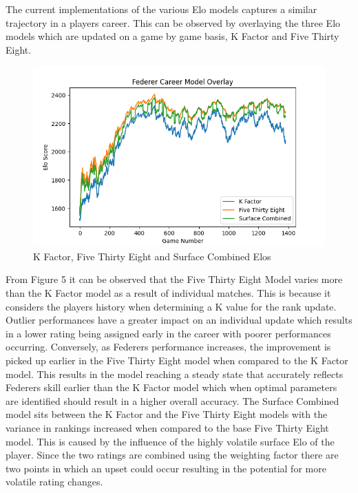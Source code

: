 \documentclass[12pt,a4paper]{article}
\begin{document}
The current implementations of the various Elo models captures a similar trajectory in a
players career. This can be observed by overlaying the three Elo models which are updated
on a game by game basis, K Factor and Five Thirty Eight.
\begin{figure}[H]
  \includegraphics[scale=0.8]{images/federer_career.png}
  \caption{K Factor, Five Thirty Eight and Surface Combined Elos}
  \label{fig:federer-k-538}
\end{figure}

From Figure 5 it can be observed that the Five Thirty Eight Model varies more than the
K Factor model as a result of individual matches. This is because it considers the players
history when determining a K value for the rank update. Outlier performances have a greater
impact on an individual update which results in a lower rating being assigned early in the
career with poorer performances occurring. Conversely, as Federers performance increases,
the improvement is picked up earlier in the Five Thirty Eight model when compared to the
K Factor model. This results in the model reaching a steady state that accurately reflects
Federers skill earlier than the K Factor model which when optimal parameters are identified
should result in a higher overall accuracy. The Surface Combined model sits between the
K Factor and the Five Thirty Eight models with the variance in rankings increased when compared
to the base Five Thirty Eight model. This is caused by the influence of the highly volatile
surface Elo of the player. Since the two ratings are combined using the weighting factor there
are two points in which an upset could occur resulting in the potential for more volatile
rating changes.

\vspace{10mm}
\noindent \hrulefill
\end{document}

